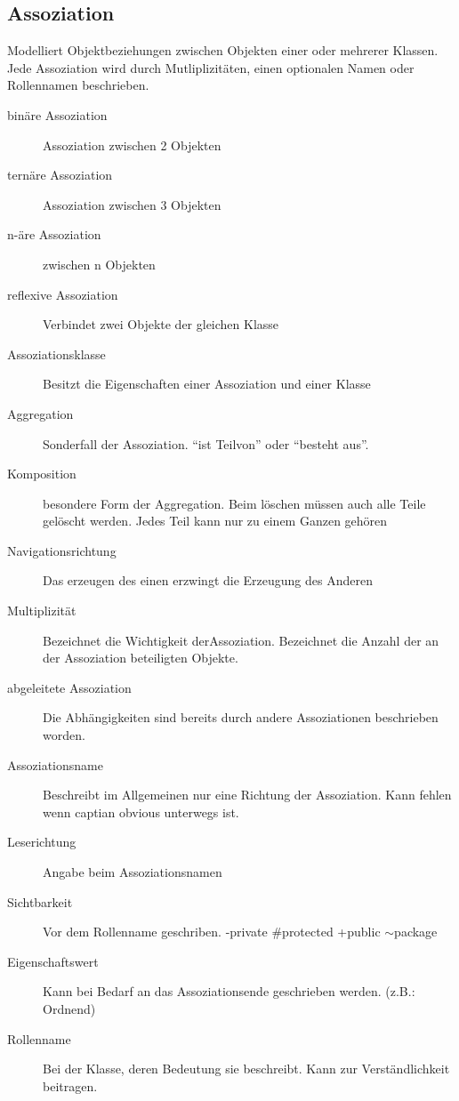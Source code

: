 \subsection{Assoziation}
	Modelliert Objektbeziehungen zwischen Objekten einer oder mehrerer Klassen.
	Jede Assoziation wird durch Mutliplizitäten, einen optionalen Namen oder Rollennamen
	beschrieben.
\begin{description}
	\item[binäre Assoziation] Assoziation zwischen 2 Objekten
	\item[ternäre Assoziation] Assoziation zwischen 3 Objekten
	\item[n-äre Assoziation] zwischen n Objekten
	\item[reflexive Assoziation] Verbindet zwei Objekte der gleichen Klasse
	\item[Assoziationsklasse] Besitzt die Eigenschaften einer Assoziation und einer
		Klasse
	\item[Aggregation] Sonderfall der Assoziation. "`ist Teilvon"' oder "`besteht
		aus"'.
	\item[Komposition] besondere Form der Aggregation. Beim löschen müssen auch
		alle Teile gelöscht werden. Jedes Teil kann nur zu einem Ganzen gehören 
	\item[Navigationsrichtung] Das erzeugen des einen erzwingt die Erzeugung des
		Anderen
	\item[Multiplizität] Bezeichnet die Wichtigkeit derAssoziation. Bezeichnet die
		Anzahl der an der Assoziation beteiligten Objekte.
	\item[abgeleitete Assoziation] Die Abhängigkeiten sind bereits durch andere
		Assoziationen beschrieben worden.
	\item[Assoziationsname] Beschreibt im Allgemeinen nur eine Richtung der
		Assoziation. Kann fehlen wenn captian obvious unterwegs ist.
	\item[Leserichtung] Angabe beim Assoziationsnamen
	\item[Sichtbarkeit] Vor dem Rollenname geschriben. -private \#protected +public
		$\sim$package
	\item[Eigenschaftswert] Kann bei Bedarf an das Assoziationsende geschrieben
		werden. (z.B.: Ordnend)
	\item[Rollenname] Bei der Klasse, deren Bedeutung sie beschreibt. Kann zur
		Verständlichkeit beitragen.
\end{description}

